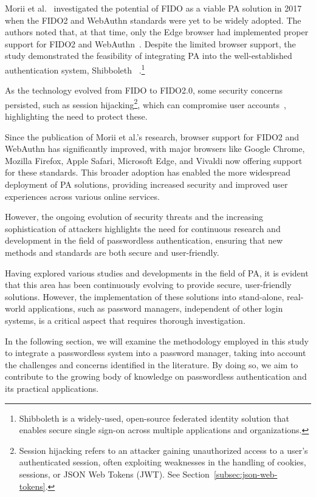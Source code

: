 Morii et al.~\cite{morii2017research} investigated the potential of FIDO as a
viable PA solution in 2017 when the FIDO2 and WebAuthn standards were yet to be
widely adopted.
The authors noted that, at that time, only the Edge browser had implemented
proper support for FIDO2 and WebAuthn~\cite{morii2017research}.
Despite the limited browser support, the study demonstrated the feasibility
of integrating PA into the well-established authentication system, Shibboleth
~\cite{shibboleth, morii2017research}.\footnote{
  Shibboleth is a widely-used, open-source federated identity solution that
  enables secure single sign-on across multiple applications and organizations.
}

As the technology evolved from FIDO to FIDO2.0, some security concerns
persisted, such as session hijacking\footnote{
  Session hijacking refers to an attacker gaining unauthorized access to a
  user's authenticated session, often exploiting weaknesses in the handling of
  cookies, sessions, or JSON Web Tokens (JWT).
  See Section~\ref{subsec:json-web-tokens}.
}, which can compromise
user accounts~\cite{morii2017research}, highlighting the need to protect these.

Since the publication of Morii et al.'s research, browser support for FIDO2 and
WebAuthn has significantly improved, with major browsers like Google Chrome,
Mozilla Firefox, Apple Safari, Microsoft Edge, and Vivaldi now offering
support for these standards.
This broader adoption has enabled the more widespread deployment of PA
solutions, providing increased security and improved user experiences across
various online services.

However, the ongoing evolution of security threats and the increasing
sophistication of attackers highlights the need for continuous research and
development in the field of passwordless authentication, ensuring that new
methods and standards are both secure and user-friendly.

Having explored various studies and developments in the field of PA, it is
evident that this area has been continuously evolving to provide secure,
user-friendly solutions.
However, the implementation of these solutions into stand-alone, real-world
applications, such as password managers, independent of other login systems, is
a critical aspect that requires thorough investigation.

In the following section, we will examine the methodology employed in this
study to integrate a passwordless system into a password manager,
taking into account the challenges and concerns identified in the literature.
By doing so, we aim to contribute to the growing body of knowledge on
passwordless authentication and its practical applications.


